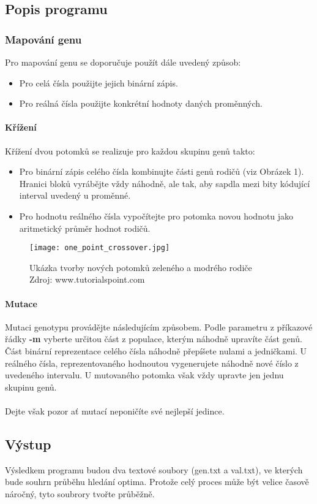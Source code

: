 \documentclass[11pt, a4paper]{article}
\begin{document}
\subsection{Popis programu}
\subsubsection{Mapování genu}
Pro mapování genu se doporučuje použít dále uvedený způsob:
\begin{itemize}
  \item Pro celá čísla použijte jejich binární zápis.
  \item Pro reálná čísla použijte konkrétní hodnoty daných proměnných.
\end{itemize}
\paragraph{Křížení}
Křížení dvou potomků se realizuje pro každou skupinu genů takto:
\begin{itemize}
  \item Pro binární zápis celého čísla kombinujte části genů rodičů (viz Obrázek 1). Hranici bloků vyrábějte vždy náhodně, ale tak, aby sapdla mezi bity kódující interval uvedený u proměnné.
  \item Pro hodnotu reálného čísla vypočítejte pro potomka novou hodnotu jako aritmetický průměr hodnot rodičů.
\end{itemize}
\begin{figure}[h]
  \texttt{[image: one\_point\_crossover.jpg]}
  \caption{Ukázka tvorby nových potomků zeleného a modrého rodiče\\Zdroj: www.tutorialspoint.com}
  \label{fig:one_point}
\end{figure}
\paragraph{Mutace}
Mutaci genotypu provádějte následujícím způsobem. Podle parametru z příkazové řádky \textbf{-m} vyberte určitou část z populace, kterým náhodně upravíte část genů. Část binární reprezentace celého čísla náhodně přepíšete nulami a jedničkami. U reálného čísla, reprezentovaného hodnoutou vygenerujete náhodně nové číslo z uvedeného intervalu. U mutovaného potomka však vždy upravte jen jednu skupinu genů.\\\\Dejte však pozor ať mutací neponičíte své nejlepší jedince.
\subsection{Výstup}
Výsledkem programu budou dva textové soubory (gen.txt a val.txt), ve kterých bude souhrn průběhu hledání optima. Protože celý proces může být velice časově náročný, tyto soubrory tvořte průběžně.
\end{document}
